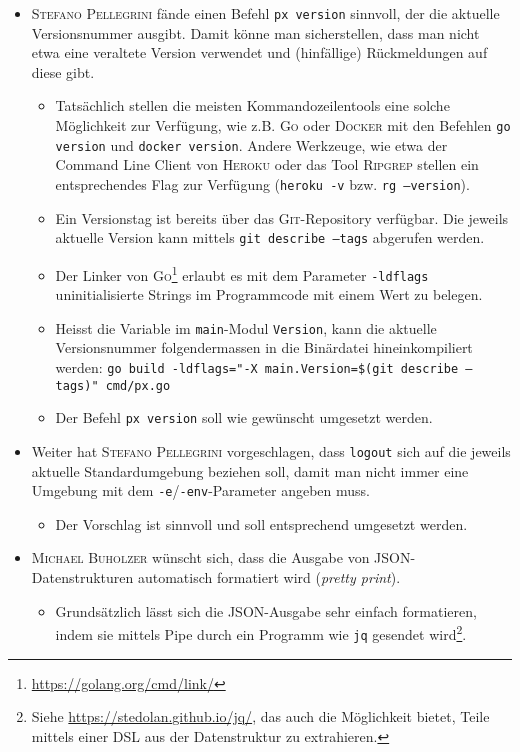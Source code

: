 \begin{itemize}
    \item \textsc{Stefano Pellegrini} fände einen Befehl \texttt{px version} sinnvoll, der die aktuelle Versionsnummer ausgibt. Damit könne man sicherstellen, dass man nicht etwa eine veraltete Version verwendet und (hinfällige) Rückmeldungen auf diese gibt.
        \begin{itemize}
            \item Tatsächlich stellen die meisten Kommandozeilentools eine solche Möglichkeit zur Verfügung, wie z.B. \textsc{Go} oder \textsc{Docker} mit den Befehlen \texttt{go version} und \texttt{docker version}. Andere Werkzeuge, wie etwa der Command Line Client von \textsc{Heroku} oder das Tool \textsc{Ripgrep} stellen ein entsprechendes Flag zur Verfügung (\texttt{heroku -v} bzw. \texttt{rg --version}).
            \item Ein Versionstag ist bereits über das \textsc{Git}-Repository verfügbar. Die jeweils aktuelle Version kann mittels \texttt{git describe --tags} abgerufen werden.
            \item Der Linker von \textsc{Go}\footnote{\url{https://golang.org/cmd/link/}} erlaubt es mit dem Parameter \texttt{-ldflags} uninitialisierte Strings im Programmcode mit einem Wert zu belegen.
            \item Heisst die Variable im \texttt{main}-Modul \texttt{Version}, kann die aktuelle Versionsnummer folgendermassen in die Binärdatei hineinkompiliert werden: \texttt{go build -ldflags="{}-X main.Version=\$(git describe --tags)"{} cmd/px.go}
            \item Der Befehl \texttt{px version} soll wie gewünscht umgesetzt werden.
        \end{itemize} 
    \item Weiter hat \textsc{Stefano Pellegrini} vorgeschlagen, dass \texttt{logout} sich auf die jeweils aktuelle Standardumgebung beziehen soll, damit man nicht immer eine Umgebung mit dem \texttt{-e}/\texttt{-env}-Parameter angeben muss.
    \begin{itemize}
        \item Der Vorschlag ist sinnvoll und soll entsprechend umgesetzt werden.
    \end{itemize}
\item \textsc{Michael Buholzer} wünscht sich, dass die Ausgabe von JSON-Datenstrukturen automatisch formatiert wird (\textit{pretty print}).
    \begin{itemize}
        \item Grundsätzlich lässt sich die JSON-Ausgabe sehr einfach formatieren, indem sie mittels Pipe durch ein Programm wie \texttt{jq} gesendet wird\footnote{Siehe \url{https://stedolan.github.io/jq/}, das auch die Möglichkeit bietet, Teile mittels einer DSL aus der Datenstruktur zu extrahieren.}.

\end{itemize}
\end{itemize}
